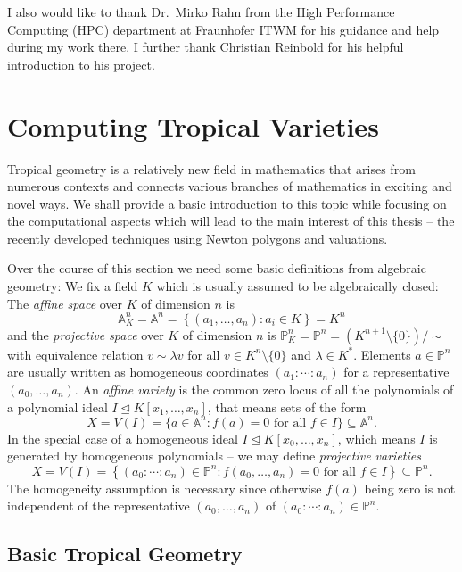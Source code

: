 \documentclass[
  paper=a4,
  titlepage,
  bibliography=totoc,
  listof=totoc,
  pagesize=pdftex
]{scrartcl}
\numberwithin{figure}{section}
\numberwithin{equation}{section}
\numberwithin{table}{section}
\newcommand*\setA{\mathds{A}}
\newcommand*\setP{\mathds{P}}
\let\idealof\trianglelefteq
\theoremstyle{definition}
\numberwithin{definition}{section}
\begin{document}
I also would like to thank Dr.~Mirko Rahn from the High Performance Computing (HPC)
department at Fraunhofer ITWM for his guidance and help during my work there. I further
thank Christian Reinbold for his helpful introduction to his project.

\section{Computing Tropical Varieties}

Tropical geometry is a relatively new field in mathematics that arises from numerous
contexts and connects various branches of mathematics in exciting and novel ways. We shall
provide a basic introduction to this topic while focusing on the computational aspects
which will lead to the main interest of this thesis -- the recently developed techniques
using Newton polygons and valuations.

Over the course of this section we need some basic definitions from algebraic geometry: We
fix a field $K$ which is usually assumed to be algebraically closed: The \emph{affine
space} over $K$ of dimension $n$ is
\[
  \setA_K^n = \setA^n = \left\{ (a_1,\dots,a_n) : a_i \in K\right\} = K^n
\]
and the \emph{projective space} over $K$ of dimension $n$ is $\setP^n_K = \setP^n =
(K^{n+1}\setminus\{0\})/\sim$ with equivalence relation $v \sim \lambda v$ for all $v \in
K^n\setminus \{0\}$ and $\lambda \in K^*$. Elements $a \in \setP^n$ are usually written as
homogeneous coordinates $(a_1:\cdots:a_n)$ for a representative $(a_0, \dots, a_n)$. An
\emph{affine variety} is the common zero locus of all the polynomials of a polynomial
ideal $I \idealof K[x_1, \dots, x_n]$, that means sets of the form
\[
  X = V(I) = \{ a \in \setA^n : f(a) = 0 \text{ for all $f\in I$} \} \subseteq \setA^n.
\]
In the special case of a homogeneous ideal $I \idealof K[x_0,\dots,x_n]$, which means $I$
is generated by homogeneous polynomials -- we may define \emph{projective varieties}
\[
  X = V(I) = \left\{ (a_0:\cdots:a_n) \in \setP^n : f(a_0, \dots, a_n) = 0
    \text{ for all $f \in I$}
  \right\} \subseteq \setP^n.
\]
The homogeneity assumption is necessary since otherwise $f(a)$ being zero is not
independent of the representative $(a_0,\dots,a_n)$ of $(a_0:\cdots:a_n)\in \setP^n$.

\subsection{Basic Tropical Geometry}
\label{sec:tropIntro}
\end{document}

